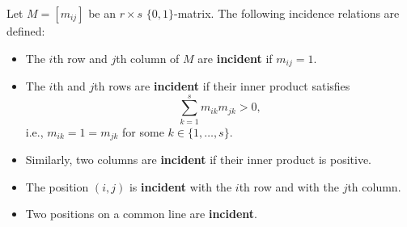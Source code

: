 Let $M = [m_{ij}]$ be an $r \times s$ $\{0,1\}$-matrix. The following incidence relations are defined:

\begin{itemize}
\item The $i$th row and $j$th column of $M$ are \textbf{incident} if $m_{ij} = 1$.
\item The $i$th and $j$th rows are \textbf{incident} if their inner product satisfies
  $$\sum_{k=1}^{s} m_{ik} m_{jk} > 0,$$
  i.e., $m_{ik} = 1 = m_{jk}$ for some $k \in \{1, \ldots, s\}$.
\item Similarly, two columns are \textbf{incident} if their inner product is positive.
\item The position $(i, j)$ is \textbf{incident} with the $i$th row and with the $j$th column.
\item Two positions on a common line are \textbf{incident}.
\end{itemize}
